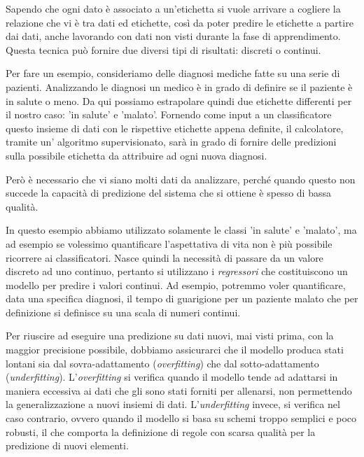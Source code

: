 \documentclass[a4paper,12pt]{report}
\begin{document}
Sapendo che ogni dato è associato a un'etichetta si vuole arrivare a cogliere la relazione che vi è tra dati ed etichette, così da poter predire le etichette a partire dai dati, anche lavorando con dati non visti durante la fase di apprendimento. 
Questa tecnica può fornire due diversi tipi di risultati: discreti o continui. 


Per fare un esempio, consideriamo delle diagnosi mediche fatte su una serie  di pazienti. 
Analizzando le diagnosi un medico è in grado di definire se il paziente è in salute o meno. Da qui possiamo estrapolare quindi due etichette differenti per il nostro caso: 'in salute' e 'malato'. 
Fornendo come input a un classificatore questo insieme di dati con le rispettive etichette appena definite, il calcolatore, tramite un’ algoritmo supervisionato, sarà in grado di fornire delle predizioni sulla possibile etichetta da attribuire ad ogni nuova diagnosi.

Però è necessario che vi siano molti dati da analizzare, perché quando questo non succede la capacità di predizione del sistema che si ottiene è spesso di bassa qualità.

In questo esempio abbiamo utilizzato solamente le classi 'in salute' e 'malato', ma ad esempio se volessimo quantificare l'aspettativa di vita non è più possibile ricorrere ai classificatori. Nasce quindi la necessità di passare da un valore discreto ad uno continuo, pertanto si utilizzano i \textit{regressori} che costituiscono un modello per predire i valori continui.
Ad esempio, potremmo voler quantificare, data una specifica diagnosi, il tempo di guarigione per un paziente malato che per definizione si definisce su una scala di numeri continui.

Per riuscire ad eseguire una predizione su dati nuovi, mai visti prima, con la maggior precisione possibile, dobbiamo assicurarci che il modello produca stati lontani sia dal sovra-adattamento (\textit{overfitting}) che dal sotto-adattamento (\textit{underfitting}).
L’\textit{overfitting} si verifica quando il modello tende ad adattarsi in maniera eccessiva ai dati che gli sono stati forniti per allenarsi, non permettendo la generalizzazione a nuovi insiemi di dati. L’\textit{underfitting} invece, si verifica nel caso contrario, ovvero quando il modello si basa su schemi troppo semplici e poco robusti, il che comporta la definizione di regole con scarsa qualità per la predizione di nuovi elementi.
\end{document}
